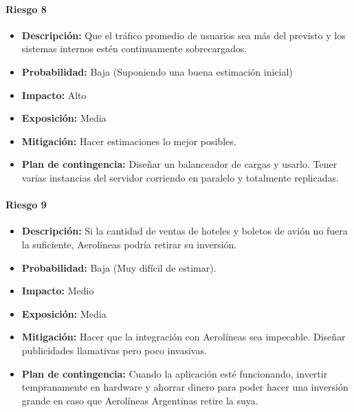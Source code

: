 \paragraph{Riesgo 8}
\begin{itemize}
  \item \textbf{Descripción:} Que el tráfico promedio de usuarios sea más del previsto y los sistemas internos estén continuamente sobrecargados.
  \item \textbf{Probabilidad:} Baja (Suponiendo una buena estimación inicial)
  \item \textbf{Impacto:} Alto
  \item \textbf{Exposición:} Media
  \item \textbf{Mitigación:} Hacer estimaciones lo mejor posibles.
  \item \textbf{Plan de contingencia:} Diseñar un balanceador de cargas y usarlo. Tener varias instancias del servidor corriendo en paralelo y totalmente replicadas.
\end{itemize}

\paragraph{Riesgo 9}
\begin{itemize}
  \item \textbf{Descripción:} Si la cantidad de ventas de hoteles y boletos de avión no fuera la suficiente, Aerolíneas podría retirar su inversión.
  \item \textbf{Probabilidad:} Baja (Muy difícil de estimar).
  \item \textbf{Impacto:} Medio
  \item \textbf{Exposición:} Media
  \item \textbf{Mitigación:} Hacer que la integración con Aerolíneas sea impecable. Diseñar publicidades llamativas pero poco invasivas.
  \item \textbf{Plan de contingencia:} Cuando la aplicación esté funcionando, invertir tempranamente en hardware y ahorrar dinero para poder hacer una inversión grande en caso que Aerolíneas Argentinas retire la suya.
\end{itemize}